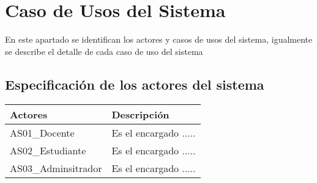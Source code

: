\newcommand\tabularhead[1]{
\begin{table}[h]
  \caption{Caso de Uso  <<#1>>}
  \begin{tabular}{|p{0.2\linewidth}|p{0.8\linewidth}|}
    \hline
    \textbf{Caso de Uso} & \textbf{#1} \\
    \hline}

  \newcommand\addrow[2]{#1 &#2\\ \hline}

  \newcommand\addmulrow[2]{ \begin{minipage}[t][][t]{2.5cm}#1\end{minipage}%
     &\begin{minipage}[t][][t]{8cm}
      \begin{enumerate} #2   \end{enumerate}
      \end{minipage}\\  \hline}

  \newenvironment{usecase}{\tabularhead}
{\hline\end{tabular}\end{table}}



\chapter{Caso de Usos del Sistema}

En este apartado se identifican los actores y casos de usos del sistema, igualmente se describe 
el detalle de cada caso de uso del sistema


\section{Especificación de los actores del sistema}


	\begin{table}[h!]	
		\begin{tabular}{ |p{4cm}|p{9cm}| }	\hline
			
			\rowcolor{gray!50}  \textbf{Actores}  &  \textbf{Descripción} \\ \hline
			
			AS01\_Docente & Es el encargado .....  \\	\hline
			
			AS02\_Estudiante & Es el encargado .....  \\	\hline
			
			AS03\_Adminsitrador & Es el encargado .....  \\	\hline
			
		\end{tabular}
	\end{table}	



